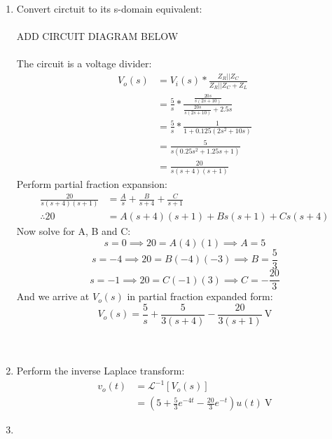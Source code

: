 \begin{enumerate}
	\item{
		Convert circtuit to its s-domain equivalent:
		\\ \\
		ADD CIRCUIT DIAGRAM BELOW
		\\ \\
		The circuit is a voltage divider:
		\begin{align*}
			V_o(s) &= V_i(s) * \frac{Z_R || Z_C}{Z_R || Z_C + Z_L} \\
			&= \frac{5}{s} * \frac{\frac{20s}{s(2s+10)}}{\frac{20s}{s(2s+10)}+2.5s} \\
			&= \frac{5}{s} * \frac{1}{1+0.125(2s^2+10s)} \\
			&= \frac{5}{s(0.25s^2+1.25s+1)} \\
			&= \frac{20}{s(s+4)(s+1)}
		\end{align*}
		Perform partial fraction expansion:
		\begin{align*}
			\frac{20}{s(s+4)(s+1)} &= \frac{A}{s} + \frac{B}{s+4} + \frac{C}{s+1} \\
			\therefore 20 &= A(s+4)(s+1) + Bs(s+1) + Cs(s+4)
		\end{align*}
		Now solve for A, B and C:
		\begin{equation*}
			s = 0 \implies 20 = A(4)(1) \implies A = 5
		\end{equation*}
		\begin{equation*}
			s = -4 \implies 20 = B(-4)(-3) \implies B = \frac{5}{3}
		\end{equation*}
		\begin{equation*}
			s = -1 \implies 20 = C(-1)(3) \implies C = -\frac{20}{3}
		\end{equation*}
		And we arrive at $V_o(s)$ in partial fraction expanded form:
		\begin{equation*}
			V_o(s) = \frac{5}{s} + \frac{5}{3(s+4)} - \frac{20}{3(s+1)} \ \mathrm{V}
		\end{equation*}
		\\ \\
	}
	\item{
		Perform the inverse Laplace transform:
		\begin{align*}
			v_o(t) &= \mathcal{L}^{-1}\left[ V_o(s) \right] \\
			&= \left(5 + \frac{5}{3}e^{-4t} - \frac{20}{3}e^{-t} \right) u(t) \ \mathrm{V}
		\end{align*}
	}
	\item{
	}
\end{enumerate}
